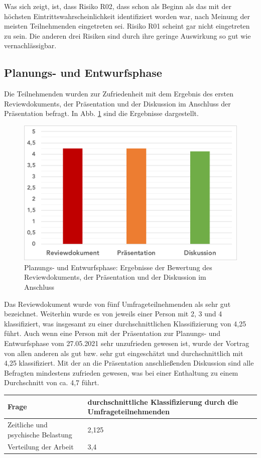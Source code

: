 \documentclass[../review_3.tex]{subfiles}
\begin{document}
Was sich zeigt, ist, dass Risiko R02, dass schon als Beginn als das mit der höchsten Eintrittswahrscheinlichkeit identifiziert worden war, nach Meinung der meisten Teilnehmenden eingetreten sei. Risiko R01 scheint gar nicht eingetreten zu sein. Die anderen drei Risiken sind durch ihre geringe Auswirkung so gut wie vernachlässigbar.

\subsection{Planungs- und Entwurfsphase}
Die Teilnehmenden wurden zur Zufriedenheit mit dem Ergebnis des ersten Reviewdokuments, der Präsentation und der Diskussion im Anschluss der Präsentation befragt. In Abb. \ref{pr1} sind die Ergebnisse dargestellt.
\begin{figure} [h]
    \centering
    \includegraphics[width = 0.7\linewidth]{img/revPraeDis1.pdf}
    \caption{Planungs- und Entwurfsphase: Ergebnisse der Bewertung des Reviewdokuments, der Präsentation und der Diskussion im Anschluss}
    \label{pr1}
\end{figure}
Das Reviewdokument wurde von fünf Umfrageteilnehmenden als sehr gut bezeichnet. Weiterhin wurde es von jeweils einer Person mit 2, 3 und 4 klassifiziert, was insgesamt zu einer durchschnittlichen Klassifizierung von 4,25 führt. Auch wenn eine Person mit der Präsentation zur Planungs- und Entwurfsphase vom 27.05.2021 sehr unzufrieden gewesen ist, wurde der Vortrag von allen anderen als gut bzw. sehr gut eingeschätzt und durchschnittlich mit 4,25 klassifiziert. Mit der an die Präsentation anschließenden Diskussion sind alle Befragten mindestens zufrieden gewesen, was bei einer Enthaltung zu einem Durchschnitt von ca. 4,7 führt.

\begin{longtable}[H]{p{} p{}}
    \toprule
    \textbf{Frage}                     & \textbf{durchschnittliche Klassifizierung durch die Umfrageteilnehmenden} \\ \midrule \endhead
    Zeitliche und psychische Belastung & 2,125                                                                     \\
    Verteilung der Arbeit              & 3,4                                                                       \\ \bottomrule
\end{longtable}
\end{document}
